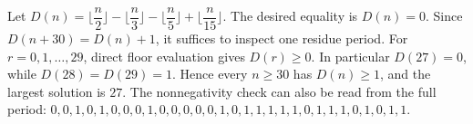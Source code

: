 Let $D(n)=\lfloor\dfrac{n}{2}\rfloor-\lfloor\dfrac{n}{3}\rfloor-\lfloor\dfrac{n}{5}\rfloor+\lfloor\dfrac{n}{15}\rfloor$. The desired equality is $D(n)=0$. Since $D(n+30)=D(n)+1$, it suffices to inspect one residue period. For $r=0,1,\ldots,29$, direct floor evaluation gives $D(r)\ge0$. In particular $D(27)=0$, while $D(28)=D(29)=1$. Hence every $n\ge30$ has $D(n)\ge1$, and the largest solution is $\boxed{27}$. The nonnegativity check can also be read from the full period: $0,0,1,0,1,0,0,0,1,0,0,0,0,0,1,0,1,1,1,1,1,0,1,1,1,0,1,0,1,1$.
